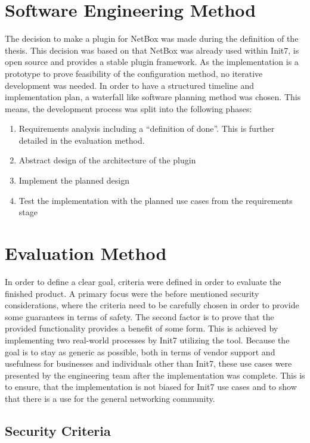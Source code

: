 \section{\label{method-soft}Software Engineering Method}

The decision to make a plugin for NetBox was made during the definition
of the thesis. This decision was based on that NetBox was already used
within Init7, is open source and provides a stable plugin framework.
As the implementation is a prototype to prove feasibility of the
configuration method, no iterative development was needed.
In order to have a structured timeline and implementation plan,
a waterfall like software planning method was chosen.
This means, the development process was split into the following phases:

\begin{enumerate}
  \item Requirements analysis including a ``definition of done''. This is further detailed
        in the evaluation method.
  \item Abstract design of the architecture of the plugin
  \item Implement the planned design
  \item Test the implementation with the planned use cases from the requirements stage
\end{enumerate}

\section{Evaluation Method}

In order to define a clear goal, criteria were defined in order to evaluate
the finished product.
A primary focus were the before mentioned security considerations,
where the criteria need to be carefully chosen in order to provide
some guarantees in terms of safety. The second factor is to prove
that the provided functionality provides a benefit of some form.
This is achieved by implementing two real-world processes by Init7
utilizing the tool. Because the goal is to stay as generic as possible,
both in terms of vendor support and usefulness for businesses and individuals
other than Init7, these use cases were presented by the engineering team
after the implementation was complete. This is to ensure, that the implementation
is not biased for Init7 use cases and to show that there is a use for
the general networking community.

\subsection{Security Criteria}

